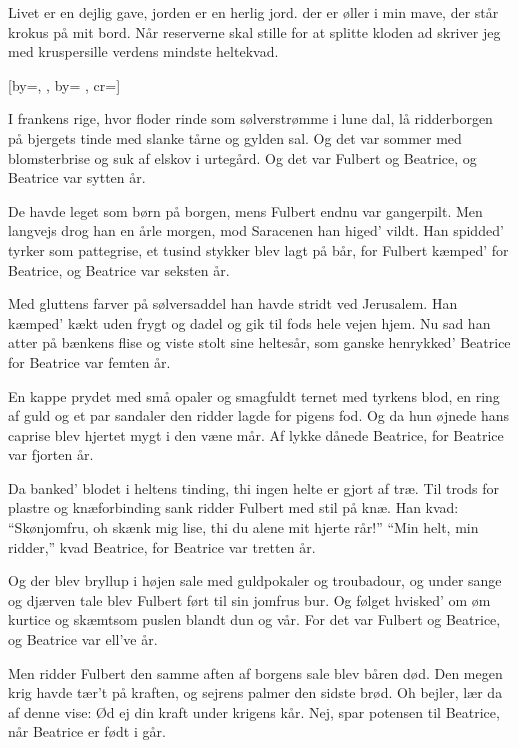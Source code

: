 \documentclass[pdftex,12pt]{article}
\begin{document}
\begin{songs}{}
\beginverse
Livet er en dejlig gave,
jorden er en herlig jord.
der er øller i min mave,
der står krokus på mit bord.
Når reserverne skal stille
for at splitte kloden ad
skriver jeg med kruspersille
verdens mindste heltekvad.
\endverse
\endsong



\renewcommand{\thepage}{10}
\addtocounter{pageoffset}{-1}﻿[by={},
,
by={}
,
cr={}]\hypertarget{Fulbert og Beatrice}{}
\label{song12}

\beginverse
I frankens rige, hvor floder rinde
som sølverstrømme i lune dal,
lå ridderborgen på bjergets tinde
med slanke tårne og gylden sal.
Og det var sommer med blomsterbrise
og suk af elskov i urtegård.
Og det var Fulbert og Beatrice,
og Beatrice var sytten år.

\endverse
\beginverse
De havde leget som børn på borgen,
mens Fulbert endnu var gangerpilt.
Men langvejs drog han en årle morgen,
mod Saracenen han higed' vildt.
Han spidded' tyrker som pattegrise,
et tusind stykker blev lagt på bår,
for Fulbert kæmped' for Beatrice,
og Beatrice var seksten år.

\endverse
\beginverse
Med gluttens farver på sølversaddel
han havde stridt ved Jerusalem.
Han kæmped' kækt uden frygt og dadel
og gik til fods hele vejen hjem.
Nu sad han atter på bænkens flise
og viste stolt sine heltesår,
som ganske henrykked' Beatrice
for Beatrice var femten år.

\endverse
\beginverse
En kappe prydet med små opaler
og smagfuldt ternet med tyrkens blod,
en ring af guld og et par sandaler
den ridder lagde for pigens fod.
Og da hun øjnede hans caprise
blev hjertet mygt i den væne mår.
Af lykke dånede Beatrice,
for Beatrice var fjorten år.

\endverse
\beginverse
Da banked' blodet i heltens tinding,
thi ingen helte er gjort af træ.
Til trods for plastre og knæforbinding
sank ridder Fulbert med stil på knæ.
Han kvad: ``Skønjomfru, oh skænk mig lise,
thi du alene mit hjerte rår!''
``Min helt, min ridder,'' kvad Beatrice,
for Beatrice var tretten år.

\endverse
\beginverse
Og der blev bryllup i højen sale
med guldpokaler og troubadour,
og under sange og djærven tale
blev Fulbert ført til sin jomfrus bur.
Og følget hvisked' om øm kurtice
og skæmtsom puslen blandt dun og vår.
For det var Fulbert og Beatrice,
og Beatrice var ell've år.

\endverse
\beginverse
Men ridder Fulbert den samme aften
af borgens sale blev båren død.
Den megen krig havde tær't på kraften,
og sejrens palmer den sidste brød.
Oh bejler, lær da af denne vise:
Ød ej din kraft under krigens kår.
Nej, spar potensen til Beatrice,
når Beatrice er født i går.


\end{songs}
\end{document}
